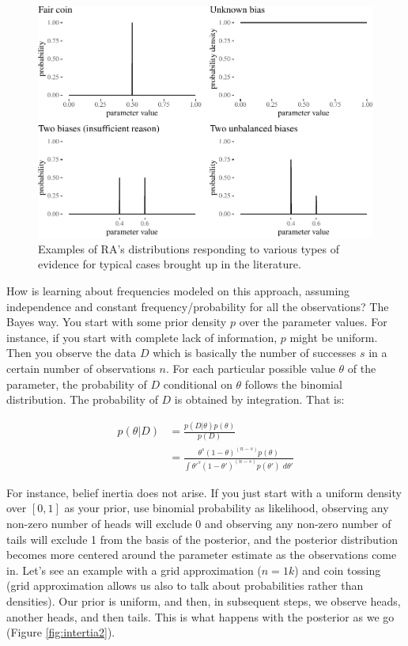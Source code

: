 \documentclass[
  10pt,
  dvipsnames,enabledeprecatedfontcommands]{scrartcl}
\begin{document}
\begin{figure}[H]

\begin{center}\includegraphics[width=1\linewidth]{chapter-outline_files/figure-latex/fig:evidenceResponse2-1} \end{center}
\caption{Examples of RA's distributions responding to various types of evidence for typical cases brought up in the literature.}
\label{fig:evidenceResponse}
\end{figure}

How is learning about frequencies modeled on this approach, assuming
independence and constant frequency/probability for all the
observations? The Bayes way. You start with some prior density \(p\)
over the parameter values. For instance, if you start with complete lack
of information, \(p\) might be uniform. Then you observe the data \(D\)
which is basically the number of successes \(s\) in a certain number of
observations \(n\). For each particular possible value \(\theta\) of the
parameter, the probability of \(D\) conditional on \(\theta\) follows
the binomial distribution. The probability of \(D\) is obtained by
integration. That is:

\begin{align*}
p(\theta \vert D) & = \frac{p(D\vert \theta)p(\theta)}{p(D)}\\
& = \frac{\theta^s (1-\theta)^{(n - s)}p(\theta)}{\int \theta'^s (1-\theta')^{(n - s)}p(\theta')\,\, d\theta'}
\end{align*}

For instance, belief inertia does not arise. If you just start with a
uniform density over \([0,1]\) as your prior, use binomial probability
as likelihood, observing any non-zero number of heads will exclude 0 and
observing any non-zero number of tails will exclude 1 from the basis of
the posterior, and the posterior distribution becomes more centered
around the parameter estimate as the observations come in. Let's see an
example with a grid approximation (\(n=1k\)) and coin tossing (grid
approximation allows us also to talk about probabilities rather than
densities). Our prior is uniform, and then, in subsequent steps, we
observe heads, another heads, and then tails. This is what happens with
the posterior as we go (Figure \ref{fig:intertia2}).
\end{document}
